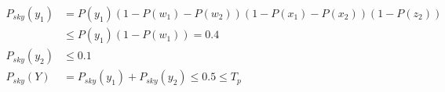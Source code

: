 \documentclass{beamer}
\begin{document}
\begin{frame}
\begin{columns}[c]
\begin{example}
\tiny
\begin{align*}
P_{sky}(y_1)&=P(y_1)(1-P(w_1)-P(w_2))(1-P(x_1)-P(x_2))(1-P(z_2))\\
            &\leq P(y_1)(1-P(w_1))=0.4\\
P_{sky}(y_2)&\leq0.1\\
P_{sky}(Y)& = P_{sky}(y_1) + P_{sky}(y_2) \leq 0.5 \leq T_p\\
\end{align*}
\end{example}
\end{columns}

\end{frame}

\end{document}
